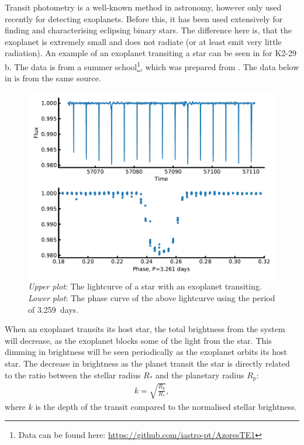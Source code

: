 Transit photometry is a well-known method in astronomy, however only used recently for detecting
exoplanets. Before this, it has been used extensively for finding and characterising eclipsing
binary stars. The difference here is, that the exoplanet is extremely small and does not radiate (or
at least emit very little radiation). An example of an exoplanet transiting a star can be seen in
 for K2-29 b. The data is from a summer school\footnote{Data can be found
here: \url{https://github.com/iastro-pt/AzoresTE1}}, which was prepared from \citet{Santerne2016}.
The data below in  is from the same source.

\begin{figure}[htpb!]
    \centering
    \includegraphics[width=1.0\linewidth]{figures/transitMethod.pdf}
    \caption{\emph{Upper plot}: The lightcurve of a star with an exoplanet transiting.
             \emph{Lower plot}: The phase curve of the above lightcurve using the period of
             \SI{3.259}{days}.}
    \label{fig:transitMethod}
\end{figure}

When an exoplanet transits its host star, the total brightness from the system will decrease, as the
exoplanet blocks some of the light from the star. This dimming in brightness will be seen
periodically as the exoplanet orbits its host star. The decrease in brightness as the planet transit
the star is directly related to the ratio between the stellar radius $R_\ast$ and the planetary
radius $R_p$:
\begin{align}
  k = \sqrt{\frac{R_p}{R_\ast}},  \label{eq:transit}
\end{align}
where $k$ is the depth of the transit compared to the normalised stellar brightness.

